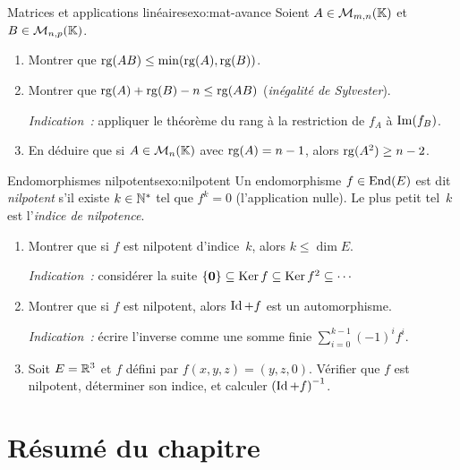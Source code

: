 \begin{exercise}{\challenging{} Matrices et applications linéaires}{exo:mat-avance}
  Soient $A\in\mathcal{M}_{m,n}({\mathbb{K}})$ et $B\in\mathcal{M}_{n,p}({\mathbb{K}})$.
  \begin{enumerate}[label=(\alph*)]
    \item Montrer que $\operatorname{rg}(AB)\leq\min(\operatorname{rg}(A),\operatorname{rg}(B))$.
    \item Montrer que $\operatorname{rg}(A)+\operatorname{rg}(B)-n\leq\operatorname{rg}(AB)$ (\emph{inégalité de
      Sylvester}).

      \emph{Indication~:} appliquer le théorème du rang à la restriction
      de $f_A$ à $\operatorname{Im}(f_B)$.
    \item En déduire que si $A\in\mathcal{M}_n({\mathbb{K}})$ avec $\operatorname{rg}(A)=n-1$, alors
      $\operatorname{rg}(A^2)\geq n-2$.
  \end{enumerate}
\end{exercise}

\begin{exercise}{\challenging{} Endomorphismes nilpotents}{exo:nilpotent}
  Un endomorphisme $f\in\operatorname{End}(E)$ est dit
  \emph{nilpotent} s'il existe $k\in{\mathbb{N}}^*$ tel que
  $f^k=0$ (l'application nulle). Le plus petit tel~$k$ est l'\emph{indice
  de nilpotence}.
  \begin{enumerate}[label=(\alph*)]
    \item Montrer que si $f$ est nilpotent d'indice~$k$, alors
      $k\leq\dim E$.

      \emph{Indication~:} considérer la suite
      $\left\{\mathbf{0}\right\}\subseteq\operatorname{Ker} f\subseteq\operatorname{Ker} f^2\subseteq\cdots$
    \item Montrer que si $f$ est nilpotent, alors $\operatorname{Id}+f$ est un
      automorphisme.

      \emph{Indication~:} écrire l'inverse comme une somme finie
      $\sum_{i=0}^{k-1}(-1)^i f^i$.
    \item Soit $E={\mathbb{R}}^3$ et $f$ défini par $f(x,y,z)=(y,z,0)$. Vérifier
      que $f$ est nilpotent, déterminer son indice, et calculer
      ${(\operatorname{Id}+f)}^{-1}$.
  \end{enumerate}
\end{exercise}

\section*{Résumé du chapitre}

